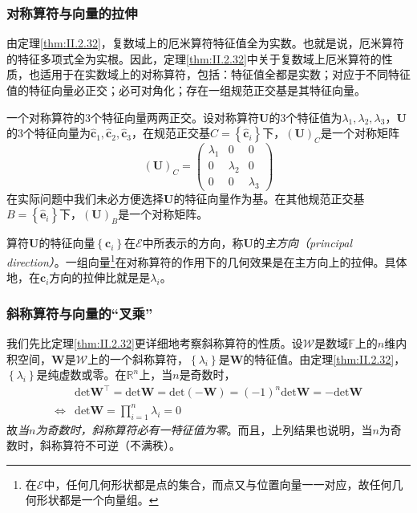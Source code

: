 \documentclass[main.tex]{subfiles}
\begin{document}
\subsubsection{对称算符与向量的拉伸}
由定理\ref{thm:II.2.32}，复数域上的厄米算符特征值全为实数。也就是说，厄米算符的特征多项式全为实根。因此，定理\ref{thm:II.2.32}中关于复数域上厄米算符的性质，也适用于在实数域上的对称算符，包括：特征值全都是实数\cite[\S 5.3 定理3.4]{周胜林2012线性代数}；对应于不同特征值的特征向量必正交\cite[\S 5.3 定理3.5]{周胜林2012线性代数}；必可对角化\cite[\S 5.3 定理3.6]{周胜林2012线性代数}；存在一组规范正交基是其特征向量。

一个对称算符的3个特征向量两两正交。设对称算符$\mathbf{U}$的3个特征值为$\lambda_1,\lambda_2,\lambda_3$，$\mathbf{U}$的3个特征向量为$\mathbf{\hat{c}}_1,\mathbf{\hat{c}}_2,\mathbf{\hat{c}}_3$，在规范正交基$C=\left\{\mathbf{\hat{c}}_i\right\}$下，$\left(\mathbf{U}\right)_C$是一个对称矩阵
\[
    \left(\mathbf{U}\right)_C=\left(\begin{array}{ccc}\lambda_1&0&0\\0&\lambda_2&0\\0&0&\lambda_3\end{array}\right)
\]
在实际问题中我们未必方便选择$\mathbf{U}$的特征向量作为基。在其他规范正交基$B=\left\{\mathbf{\hat{e}}_i\right\}$下，$\left(\mathbf{U}\right)_B$是一个对称矩阵。

算符$\mathbf{U}$的特征向量$\left\{\mathbf{c}_i\right\}$在$\mathcal{E}$中所表示的方向，称$\mathbf{U}$的\emph{主方向（principal direction）}。一组向量\footnote{在$\mathcal{E}$中，任何几何形状都是点的集合，而点又与位置向量一一对应，故任何几何形状都是一个向量组。}在对称算符的作用下的几何效果是在主方向上的拉伸。具体地，在$\mathbf{c}_i$方向的拉伸比就是是$\lambda_i$。

\subsubsection{斜称算符与向量的“叉乘”}
我们先比定理\ref{thm:II.2.32}更详细地考察斜称算符的性质。设$\mathcal{W}$是数域$\mathbb{F}$上的$n$维内积空间，$\mathbf{W}$是$\mathcal{W}$上的一个斜称算符，$\left\{\lambda_i\right\}$是$\mathbf{W}$的特征值。由定理\ref{thm:II.2.32}，$\left\{\lambda_i\right\}$是纯虚数或零。在$\mathbb{R}^n$上，当$n$是奇数时，
\begin{align*}
                    & \mathrm{det}\mathbf{W}^\intercal=\mathrm{det}\mathbf{W}=\mathrm{det}\left(-\mathbf{W}\right)=\left(-1\right)^n\mathrm{det}\mathbf{W}=-\mathrm{det}\mathbf{W} \\
    \Leftrightarrow & \mathrm{det}\mathbf{W}=\prod_{i=1}^n\lambda_i=0
\end{align*}
故\emph{当$n$为奇数时，斜称算符必有一特征值为零}。而且，上列结果也说明，当$n$为奇数时，斜称算符不可逆（不满秩）。
\end{document}
